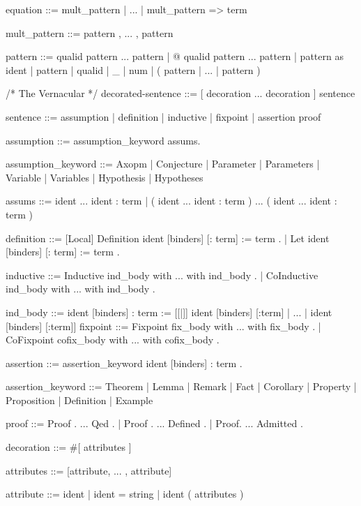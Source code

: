 \documentclass[a4paper,11pt]{article}
\begin{document}
\begin{grm}
equation  ::=  mult_pattern | ... | mult_pattern => term

mult_pattern  ::=  pattern , ... , pattern

pattern  ::=  qualid pattern ... pattern
			| @ qualid pattern ... pattern
			| pattern as ident
			| pattern %
			| qualid
			| _ 
			| num
			| ( pattern | ... | pattern )

/* The Vernacular */
decorated-sentence  ::=  [ decoration ... decoration ] sentence

sentence  ::=  assumption 
			|  definition
			| inductive
			| fixpoint
			| assertion proof
			
assumption  ::=  assumption_keyword assums.

assumption_keyword  ::=  Axopm 
					  | Conjecture	
					  | Parameter	
					  | Parameters
					  | Variable
					  | Variables
					  | Hypothesis
					  | Hypotheses
					  	
assums  ::=  ident ... ident : term
		   | ( ident ... ident : term ) ... ( ident ... ident : term )					
		   
definition  ::=  [Local] Definition ident [binders] [: term] := term .		   
		       | Let ident [binders] [: term] := term .

inductive  ::=  Inductive ind_body with ... with ind_body .
			  | CoInductive ind_body with ... with ind_body .
			  
ind_body  ::=  ident [binders] : term := 
				[[|]] ident [binders] [:term] | ... | ident [binders] [:term]]			  
fixpoint  ::=  Fixpoint fix_body with ... with fix_body .
			 | CoFixpoint cofix_body with ... with cofix_body .

assertion  ::=  assertion_keyword ident [binders] : term .

assertion_keyword  ::=  Theorem | Lemma
					  | Remark | Fact
					  | Corollary | Property | Proposition
					  | Definition | Example

proof  ::=  Proof . ... Qed .
		  | Proof . ... Defined .
		  | Proof. ... Admitted .

decoration  ::=  #[ attributes ]

attributes  ::=  [attribute, ... , attribute]

attribute  ::=  ident
			  | ident = string
			  | ident ( attributes )

\end{grm}


{}

\end{document}
